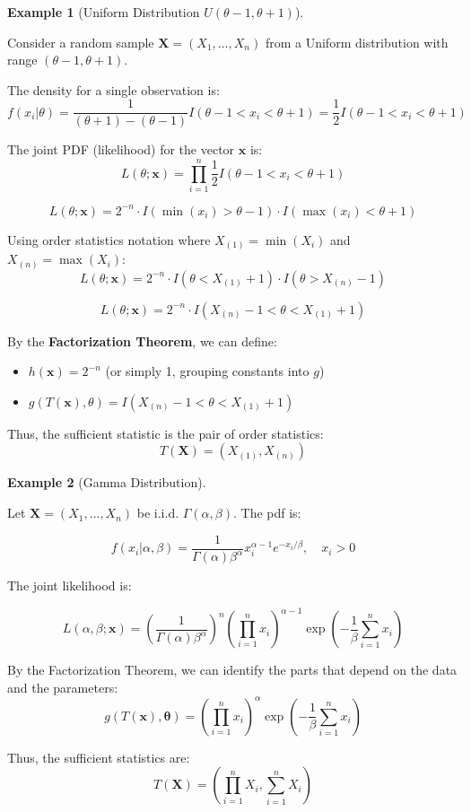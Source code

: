 \documentclass[
  letterpaper,
  DIV=11,
  numbers=noendperiod]{scrreprt}
\providecommand{\tightlist}{%
  \setlength{\itemsep}{0pt}\setlength{\parskip}{0pt}}
\renewcommand{\[}{\begin{equation}}
\renewcommand{\]}{\end{equation}}
\theoremstyle{definition}
\theoremstyle{plain}
\theoremstyle{plain}
\theoremstyle{plain}
\theoremstyle{definition}
\newtheorem{example}{Example}[chapter]
\theoremstyle{plain}
\theoremstyle{remark}
\begin{document}
\begin{example}[Uniform Distribution
\(U(\theta-1, \theta+1)\)]\protect\hypertarget{exm-uniform-sufficiency}{}\label{exm-uniform-sufficiency}

Consider a random sample \(\mathbf{X} = (X_1, \dots, X_n)\) from a
Uniform distribution with range \((\theta-1, \theta+1)\).

The density for a single observation is: \[
f(x_i|\theta) = \frac{1}{(\theta+1) - (\theta-1)} I(\theta-1 < x_i < \theta+1) = \frac{1}{2} I(\theta-1 < x_i < \theta+1)
\]

The joint PDF (likelihood) for the vector \(\mathbf{x}\) is: \[
L(\theta; \mathbf{x}) = \prod_{i=1}^n \frac{1}{2} I(\theta-1 < x_i < \theta+1)
\]

\[
L(\theta; \mathbf{x}) = 2^{-n} \cdot I( \min(x_i) > \theta-1 ) \cdot I( \max(x_i) < \theta+1 )
\]

Using order statistics notation where \(X_{(1)} = \min(X_i)\) and
\(X_{(n)} = \max(X_i)\): \[
L(\theta; \mathbf{x}) = 2^{-n} \cdot I( \theta < X_{(1)} + 1 ) \cdot I( \theta > X_{(n)} - 1 )
\]

\[
L(\theta; \mathbf{x}) = 2^{-n} \cdot I( X_{(n)} - 1 < \theta < X_{(1)} + 1 )
\]

By the \textbf{Factorization Theorem}, we can define:

\begin{itemize}
\tightlist
\item
  \(h(\mathbf{x}) = 2^{-n}\) (or simply 1, grouping constants into
  \(g\))
\item
  \(g(T(\mathbf{x}), \theta) = I( X_{(n)} - 1 < \theta < X_{(1)} + 1 )\)
\end{itemize}

Thus, the sufficient statistic is the pair of order statistics: \[
T(\mathbf{X}) = (X_{(1)}, X_{(n)})
\]

\end{example}

\begin{example}[Gamma
Distribution]\protect\hypertarget{exm-gamma-sufficiency}{}\label{exm-gamma-sufficiency}

Let \(\mathbf{X} = (X_1, \dots, X_n)\) be i.i.d.
\(\Gamma(\alpha, \beta)\). The pdf is:

\[
f(x_i|\alpha, \beta) = \frac{1}{\Gamma(\alpha)\beta^\alpha} x_i^{\alpha-1} e^{-x_i/\beta}, \quad x_i > 0
\]

The joint likelihood is:

\[
L(\alpha, \beta; \mathbf{x}) = \left( \frac{1}{\Gamma(\alpha)\beta^\alpha} \right)^n \left( \prod_{i=1}^n x_i \right)^{\alpha-1} \exp\left( -\frac{1}{\beta} \sum_{i=1}^n x_i \right)
\]

By the Factorization Theorem, we can identify the parts that depend on
the data and the parameters: \[
g(T(\mathbf{x}), \mathbf{\theta}) = \left( \prod_{i=1}^n x_i \right)^{\alpha} \exp\left( -\frac{1}{\beta} \sum_{i=1}^n x_i \right)
\]

Thus, the sufficient statistics are: \[
T(\mathbf{X}) = \left( \prod_{i=1}^n X_i, \sum_{i=1}^n X_i \right)
\]

\end{example}
\end{document}

